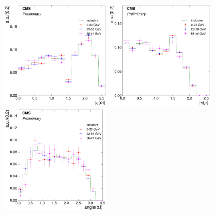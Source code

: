 \begin{figure}[hbtp]
    \centering
     \includegraphics[width=0.48\textwidth]{Chapters/04_Analysis/04b_XSections/images/8TeV/fit_variables/electron/MT/electron_absolute_eta/qcd/MT_electron_absolute_eta_0orMoreBtag_QCD_template_comparison.pdf}\hfill
	 \includegraphics[width=0.48\textwidth]{Chapters/04_Analysis/04b_XSections/images/8TeV/fit_variables/muon/MT/muon_absolute_eta/qcd/MT_muon_absolute_eta_0orMoreBtag_QCD_template_comparison.pdf}\\
     \includegraphics[width=0.48\textwidth]{Chapters/04_Analysis/04b_XSections/images/8TeV/fit_variables/electron/MT/angle_bl/qcd/MT_angle_bl_1orMoreBtag_QCD_template_comparison.pdf}\hfill

\end{figure}
